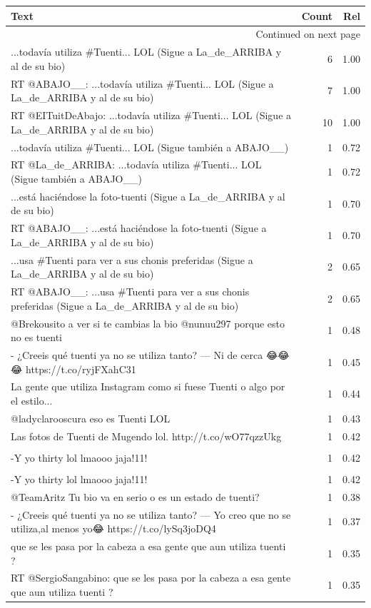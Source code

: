\begin{longtable}{p{12.5cm}rr}
\toprule
Text & Count & Rel \\
\midrule
\endhead
\midrule
\multicolumn{3}{r}{{Continued on next page}} \\
\midrule
\endfoot

\bottomrule
\endlastfoot
...todavía utiliza \#Tuenti... LOL
 (Sigue a La\_de\_ARRIBA y al de su bio) & 6 & 1.00 \\
RT @ABAJO\_\_: ...todavía utiliza \#Tuenti... LOL
 (Sigue a La\_de\_ARRIBA y al de su bio) & 7 & 1.00 \\
RT @EITuitDeAbajo: ...todavía utiliza \#Tuenti... LOL
 (Sigue a La\_de\_ARRIBA y al de su bio) & 10 & 1.00 \\
...todavía utiliza \#Tuenti... LOL
 (Sigue también a ABAJO\_\_) & 1 & 0.72 \\
RT @La\_de\_ARRIBA: ...todavía utiliza \#Tuenti... LOL
 (Sigue también a ABAJO\_\_) & 1 & 0.72 \\
...está haciéndose la foto-tuenti
 (Sigue a La\_de\_ARRIBA y al de su bio) & 1 & 0.70 \\
RT @ABAJO\_\_: ...está haciéndose la foto-tuenti
 (Sigue a La\_de\_ARRIBA y al de su bio) & 1 & 0.70 \\
...usa \#Tuenti para ver a sus chonis preferidas
 (Sigue a La\_de\_ARRIBA y al de su bio) & 2 & 0.65 \\
RT @ABAJO\_\_: ...usa \#Tuenti para ver a sus chonis preferidas
 (Sigue a La\_de\_ARRIBA y al de su bio) & 2 & 0.65 \\
@Brekousito a ver si te cambias la bio @nunuu297 porque esto no es tuenti & 1 & 0.48 \\
[C] - ¿Creeis qué tuenti ya no se utiliza tanto? — Ni de cerca 😂😂😂 https://t.co/ryjFXahC31 & 1 & 0.45 \\
La gente que utiliza Instagram como si fuese Tuenti o algo por el estilo... 👊🏻👊🏻👊🏻 & 1 & 0.44 \\
@ladyclarooscura eso es Tuenti LOL & 1 & 0.43 \\
Las fotos de Tuenti de Mugendo lol. http://t.co/wO77qzzUkg & 1 & 0.42 \\
\begin{tabular}[c]{@{}l@{}}-Tengo tuenti \\ -Y yo thirty lol lmaooo jaja!11!\end{tabular} & 1 & 0.42 \\
\begin{tabular}[c]{@{}l@{}}RT @gordooficial\_: -Tengo tuenti \\ -Y yo thirty lol lmaooo jaja!11!\end{tabular} & 1 & 0.42 \\
@TeamAritz Tu bio va en serio o es un estado de tuenti? & 1 & 0.38 \\
[C] - ¿Creeis qué tuenti ya no se utiliza tanto? — Yo creo que no se utiliza,al menos yo😂 https://t.co/lySq3joDQ4 & 1 & 0.37 \\
que se les pasa por la cabeza a esa gente que aun utiliza tuenti ? 😬🔫 & 1 & 0.35 \\
RT @SergioSangabino: que se les pasa por la cabeza a esa gente que aun utiliza tuenti ? 😬🔫 & 1 & 0.35 \\


\end{longtable}
